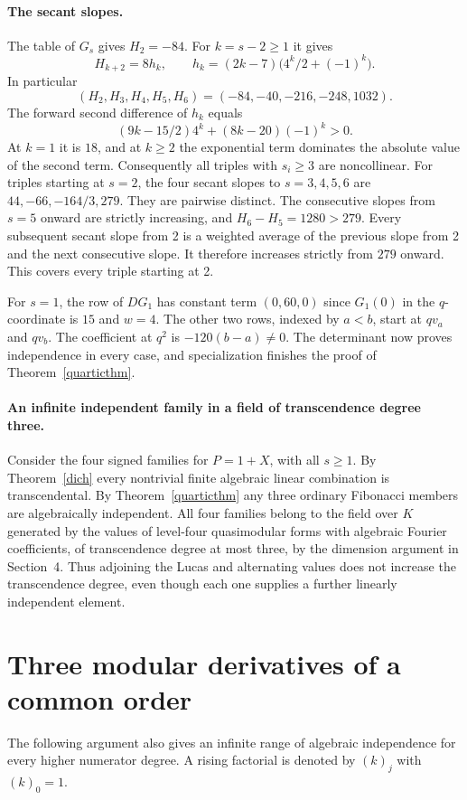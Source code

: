 \documentclass[11pt]{article}
\begin{document}
\clearpage
\paragraph{The secant slopes.}
The table of $G_s$ gives $H_2=-84$. For $k=s-2\ge1$ it gives
\begin{equation}\label{quartich}
 H_{k+2}=8h_k,\qquad h_k=(2k-7)\bigl(4^k/2+(-1)^k\bigr).
\end{equation}
In particular
\[
 (H_2,H_3,H_4,H_5,H_6)=(-84,-40,-216,-248,1032).
\]
The forward second difference of $h_k$ equals
\[
 (9k-15/2)4^k+(8k-20)(-1)^k>0.
\]
At $k=1$ it is $18$, and at $k\ge2$ the exponential term dominates the absolute value of the second term. Consequently all triples with $s_i\ge3$ are noncollinear. For triples starting at $s=2$, the four secant slopes to $s=3,4,5,6$ are $44,-66,-164/3,279$. They are pairwise distinct. The consecutive slopes from $s=5$ onward are strictly increasing, and $H_6-H_5=1280>279$. Every subsequent secant slope from 2 is a weighted average of the previous slope from 2 and the next consecutive slope. It therefore increases strictly from $279$ onward. This covers every triple starting at 2.

For $s=1$, the row of $DG_1$ has constant term $(0,60,0)$ since $G_1(0)$ in the $q$-coordinate is $15$ and $w=4$. The other two rows, indexed by $a<b$, start at $qv_a$ and $qv_b$. The coefficient at $q^2$ is $-120(b-a)\ne0$. The determinant now proves independence in every case, and specialization finishes the proof of Theorem~\ref{quarticthm}.

\paragraph{An infinite independent family in a field of transcendence degree three.}
Consider the four signed families for $P=1+X$, with all $s\ge1$. By Theorem~\ref{dich} every nontrivial finite algebraic linear combination is transcendental. By Theorem~\ref{quarticthm} any three ordinary Fibonacci members are algebraically independent. All four families belong to the field over $K$ generated by the values of level-four quasimodular forms with algebraic Fourier coefficients, of transcendence degree at most three, by the dimension argument in Section~4. Thus adjoining the Lucas and alternating values does not increase the transcendence degree, even though each one supplies a further linearly independent element.

\section{Three modular derivatives of a common order}\label{high}
The following argument also gives an infinite range of algebraic independence for every higher numerator degree. A rising factorial is denoted by $(k)_j$ with $(k)_0=1$.
\end{document}
